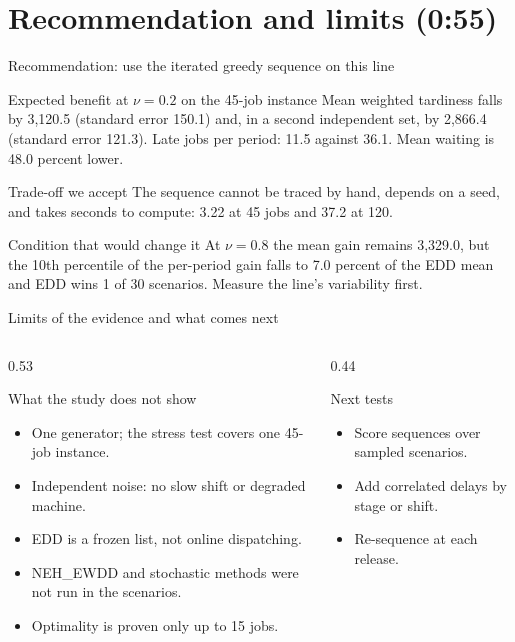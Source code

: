 \documentclass[aspectratio=169,11pt]{beamer}
\begin{document}
\section{Recommendation and limits (0:55)}\label{sec:recommend}
\begin{frame}{Recommendation: use the iterated greedy sequence on this line}
\begin{block}{Expected benefit at $\nu = 0.2$ on the 45-job instance}
\small
Mean weighted tardiness falls by 3,120.5 (standard error 150.1) and, in a second independent set, by 2,866.4 (standard error 121.3). Late jobs per period: 11.5 against 36.1. Mean waiting is 48.0 percent lower.
\end{block}
\begin{block}{Trade-off we accept}
\small
The sequence cannot be traced by hand, depends on a seed, and takes seconds to compute: 3.22 at 45 jobs and 37.2 at 120.
\end{block}
\begin{block}{Condition that would change it}
\small
At $\nu = 0.8$ the mean gain remains 3,329.0, but the 10th percentile of the per-period gain falls to 7.0 percent of the EDD mean and EDD wins 1 of 30 scenarios. Measure the line's variability first.
\end{block}
\end{frame}

\begin{frame}{Limits of the evidence and what comes next}
\begin{columns}[T,onlytextwidth]
\begin{column}{0.53\textwidth}
\begin{block}{What the study does not show}
\footnotesize
\begin{itemize}
\item One generator; the stress test covers one 45-job instance.
\item Independent noise: no slow shift or degraded machine.
\item EDD is a frozen list, not online dispatching.
\item NEH\_EWDD and stochastic methods were not run in the scenarios.
\item Optimality is proven only up to 15 jobs.
\end{itemize}
\end{block}
\end{column}
\begin{column}{0.44\textwidth}
\begin{block}{Next tests}
\footnotesize
\begin{itemize}
\item Score sequences over sampled scenarios.
\item Add correlated delays by stage or shift.
\item Re-sequence at each release.
\end{itemize}
\end{block}
\end{column}
\end{columns}
\end{frame}
\end{document}
